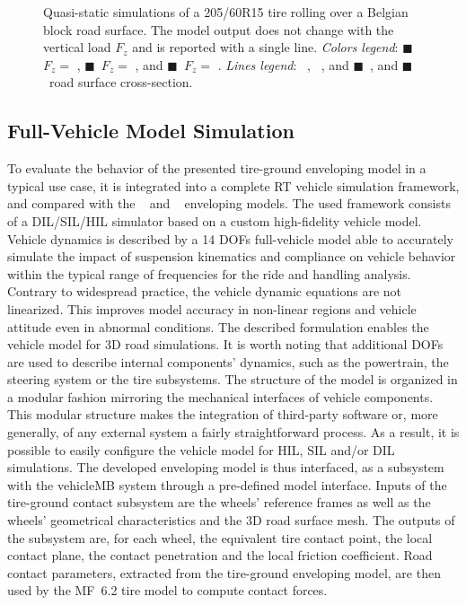 \begin{figure}[!htb]
  \centering
  \caption{Quasi-static simulations of a 205/60R15 tire rolling over a Belgian block road surface. The \TMEasy{} model output does not change with the vertical load $F_z$ and is reported with a single line. \emph{Colors legend}: {\color{mycolor1}$\blacksquare$}~$F_z =$ , {\color{mycolor2}$\blacksquare$}~$F_z =$ , and {\color{mycolor3}$\blacksquare$}~$F_z =$ . \emph{Lines legend}: \raisebox{1.0pt}{\textbf{---}}~\Enve{}, \raisebox{1.0pt}{\textbf{--~--}}~\Swift{}, and {\color{mycolor5}$\blacksquare$}~\TMEasy{}, and {\color{black}$\blacksquare$}~road surface cross-section.}
  \label{app2:fig:cobblestone}
\end{figure}


\subsection{Full-Vehicle Model Simulation}
\label{app2:sec:simulator}

To evaluate the behavior of the presented tire-ground enveloping model in a typical use case, it is integrated into a complete \ac{RT} vehicle simulation framework, and compared with the \Swift{}~\cite{schmeitz2004semiempirical} and \TMEasy~\cite{rill2013tmeasy, rill2018sophisticated}{} enveloping models. The used framework consists of a DIL/SIL/HIL simulator based on a custom high-fidelity vehicle model. Vehicle dynamics is described by a 14 \acp{DOF} full-vehicle model able to accurately simulate the impact of suspension kinematics and compliance on vehicle behavior within the typical range of frequencies for the ride and handling analysis. Contrary to widespread practice, the vehicle dynamic equations are not linearized. This improves model accuracy in non-linear regions and vehicle attitude even in abnormal conditions. The described formulation enables the vehicle model for 3D road simulations. It is worth noting that additional \acp{DOF} are used to describe internal components' dynamics, such as the powertrain, the steering system or the tire subsystems. The structure of the model is organized in a modular fashion mirroring the mechanical interfaces of vehicle components. This modular structure makes the integration of third-party software or, more generally, of any external system a fairly straightforward process. As a result, it is possible to easily configure the vehicle model for HIL, SIL and/or DIL simulations. The developed enveloping model is thus interfaced, as a subsystem with the vehicle\ac{MB} system through a pre-defined model interface. Inputs of the tire-ground contact subsystem are the wheels' reference frames as well as the wheels' geometrical characteristics and the 3D road surface mesh. The outputs of the subsystem are, for each wheel, the equivalent tire contact point, the local contact plane, the contact penetration and the local friction coefficient. Road contact parameters, extracted from the tire-ground enveloping model, are then used by the \ac{MF}~6.2 tire model to compute contact forces.

